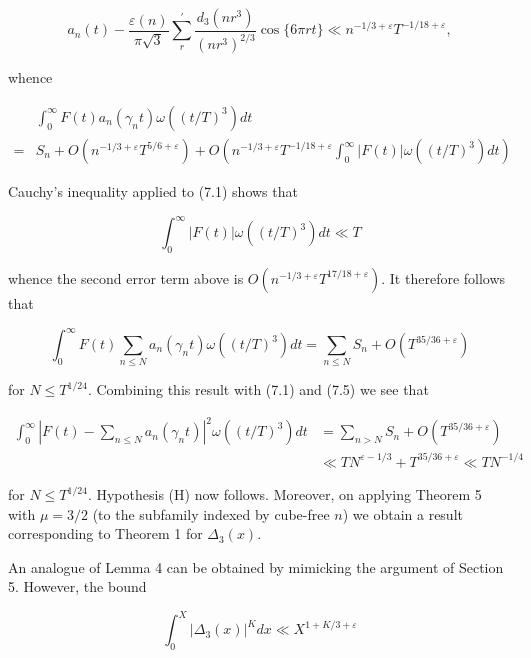 \documentclass[10pt]{article}
\begin{document}
$$
a_{n}(t)-\frac{\varepsilon(n)}{\pi \sqrt{3}} \sum_{r}^{\prime} \frac{d_{3}\left(n r^{3}\right)}{\left(n r^{3}\right)^{2 / 3}} \cos \{6 \pi r t\} \ll n^{-1 / 3+\varepsilon} T^{-1 / 18+\varepsilon},
$$

whence

$$
\begin{aligned}
& \int_{0}^{\infty} F(t) a_{n}\left(\gamma_{n} t\right) \omega\left((t / T)^{3}\right) d t \\
= & S_{n}+O\left(n^{-1 / 3+\varepsilon} T^{5 / 6+\varepsilon}\right)+O\left(n^{-1 / 3+\varepsilon} T^{-1 / 18+\varepsilon} \int_{0}^{\infty}|F(t)| \omega\left((t / T)^{3}\right) d t\right)
\end{aligned}
$$

Cauchy's inequality applied to (7.1) shows that

$$
\int_{0}^{\infty}|F(t)| \omega\left((t / T)^{3}\right) d t \ll T
$$

whence the second error term above is $O\left(n^{-1 / 3+\varepsilon} T^{17 / 18+\varepsilon}\right)$. It therefore follows that

$$
\int_{0}^{\infty} F(t) \sum_{n \leq N} a_{n}\left(\gamma_{n} t\right) \omega\left((t / T)^{3}\right) d t=\sum_{n \leq N} S_{n}+O\left(T^{35 / 36+\varepsilon}\right)
$$

for $N \leq T^{1 / 24}$. Combining this result with (7.1) and (7.5) we see that

$$
\begin{aligned}
\int_{0}^{\infty}\left|F(t)-\sum_{n \leq N} a_{n}\left(\gamma_{n} t\right)\right|^{2} \omega\left((t / T)^{3}\right) d t & =\sum_{n>N} S_{n}+O\left(T^{35 / 36+\varepsilon}\right) \\
& \ll T N^{\varepsilon-1 / 3}+T^{35 / 36+\varepsilon} \ll T N^{-1 / 4}
\end{aligned}
$$

for $N \leq T^{1 / 24}$. Hypothesis (H) now follows. Moreover, on applying Theorem 5 with $\mu=3 / 2$ (to the subfamily indexed by cube-free $n$) we obtain a result corresponding to Theorem 1 for $\Delta_{3}(x)$.

An analogue of Lemma 4 can be obtained by mimicking the argument of Section 5. However, the bound


\begin{equation*}
\int_{0}^{X}\left|\Delta_{3}(x)\right|^{K} d x \ll X^{1+K / 3+\varepsilon} \tag{7.9}
\end{equation*}
\end{document}
